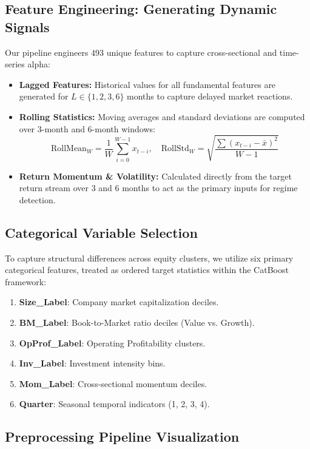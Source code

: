 \documentclass[11pt]{article}
\begin{document}
\subsection{Feature Engineering: Generating Dynamic Signals}
Our pipeline engineers 493 unique features to capture cross-sectional and time-series alpha:
\begin{itemize}
    \item \textbf{Lagged Features:} Historical values for all fundamental features are generated for $L \in \{1, 2, 3, 6\}$ months to capture delayed market reactions.
    \item \textbf{Rolling Statistics:} Moving averages and standard deviations are computed over 3-month and 6-month windows:
    \[ \text{RollMean}_W = \frac{1}{W} \sum_{i=0}^{W-1} x_{t-i}, \quad \text{RollStd}_W = \sqrt{\frac{\sum (x_{t-i} - \bar{x})^2}{W-1}} \]
    \item \textbf{Return Momentum \& Volatility:} Calculated directly from the target return stream over 3 and 6 months to act as the primary inputs for regime detection.
\end{itemize}

\subsection{Categorical Variable Selection}
To capture structural differences across equity clusters, we utilize six primary categorical features, treated as ordered target statistics within the CatBoost framework:
\begin{enumerate}
    \item \textbf{Size\_Label}: Company market capitalization deciles.
    \item \textbf{BM\_Label}: Book-to-Market ratio deciles (Value vs. Growth).
    \item \textbf{OpProf\_Label}: Operating Profitability clusters.
    \item \textbf{Inv\_Label}: Investment intensity bins.
    \item \textbf{Mom\_Label}: Cross-sectional momentum deciles.
    \item \textbf{Quarter}: Seasonal temporal indicators (1, 2, 3, 4).
\end{enumerate}

\subsection{Preprocessing Pipeline Visualization}
\end{document}
